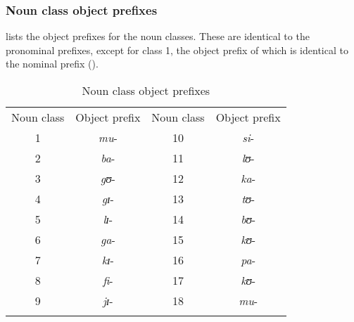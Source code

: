 \subsubsection{Noun class object prefixes}\label{sectionNCLOM}
  lists the object prefixes for the noun classes. These are identical to the pronominal prefixes, except for class 1, the object prefix of which is identical to the nominal prefix ().
\begin{table}[H]
	\begin{center}
		\begin{tabular}{cccc}
			\lsptoprule 
			\footnotesize{Noun class} & \footnotesize{Object prefix} & \footnotesize{Noun class} & \footnotesize{Object prefix}\\ 
			\cmidrule(r){1-2}\cmidrule(l){3-4}
			1 & \textit{mu}- & 10 & \textit{si}-\\ 
			2 & \textit{ba}- & 11 & \textit{lʊ}-\\ 
			3 & \textit{gʊ}- & 12 & \textit{ka}- \\ 
			4 & \textit{gɪ}- & 13 & \textit{tʊ}- \\
			5 & \textit{lɪ}- & 14 & \textit{bʊ}- \\
			6 & \textit{ga}- & 15 & \textit{kʊ}-\\
			7 & \textit{kɪ}- & 16 & \textit{pa}-\\
			8 & \textit{fi}- & 17 & \textit{kʊ}-\\
			9 & \textit{jɪ}- & 18 & \textit{mu}-\\
			\lspbottomrule 
		\end{tabular}
		\caption{Noun class object prefixes}\label{OMNCL}
	\end{center}
\end{table}

\clearpage

